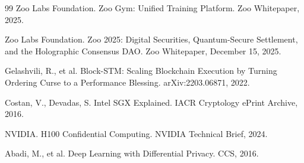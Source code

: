 \documentclass[11pt,letterpaper]{article}
\begin{document}
\begin{thebibliography}{99}
Zoo Labs Foundation.
\newblock Zoo Gym: Unified Training Platform.
\newblock Zoo Whitepaper, 2025.

Zoo Labs Foundation.
\newblock Zoo 2025: Digital Securities, Quantum-Secure Settlement, and the Holographic Consensus DAO.
\newblock Zoo Whitepaper, December 15, 2025.

Gelashvili, R., et al.
\newblock Block-STM: Scaling Blockchain Execution by Turning Ordering Curse to a Performance Blessing.
\newblock arXiv:2203.06871, 2022.

Costan, V., Devadas, S.
\newblock Intel SGX Explained.
\newblock IACR Cryptology ePrint Archive, 2016.

NVIDIA.
\newblock H100 Confidential Computing.
\newblock NVIDIA Technical Brief, 2024.

Abadi, M., et al.
\newblock Deep Learning with Differential Privacy.
\newblock CCS, 2016.

\end{thebibliography}
\end{document}
